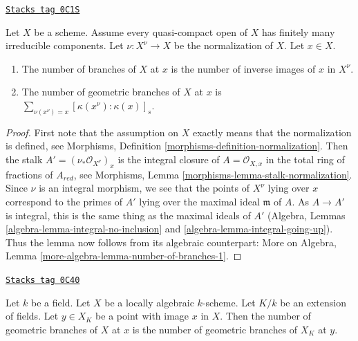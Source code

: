 \begin{lemma}
\label{varieties-lemma-number-of-branches}
\href{https://stacks.math.columbia.edu/tag/0C1S}{\texttt{Stacks tag 0C1S}}

Let $X$ be a scheme. Assume every quasi-compact open of $X$ has
finitely many irreducible components. Let $\nu : X^\nu \to X$
be the normalization of $X$. Let $x \in X$.
\begin{enumerate}
\item The number of branches of $X$ at $x$ is the number of
inverse images of $x$ in $X^\nu$.
\item The number of geometric branches of $X$ at $x$ is
$\sum_{\nu(x^\nu) = x} [\kappa(x^\nu) : \kappa(x)]_s$.
\end{enumerate}
\end{lemma}

\begin{proof}
First note that the assumption on $X$ exactly means that the
normalization is defined, see
Morphisms, Definition \ref{morphisms-definition-normalization}.
Then the stalk $A' = (\nu_*\mathcal{O}_{X^\nu})_x$ is the
integral closure of $A = \mathcal{O}_{X, x}$ in the total
ring of fractions of $A_{red}$, see
Morphisms, Lemma \ref{morphisms-lemma-stalk-normalization}.
Since $\nu$ is an integral morphism, we see that
the points of $X^\nu$ lying over $x$ correspond
to the primes of $A'$ lying over the maximal ideal $\mathfrak m$
of $A$. As $A \to A'$ is integral, this is the same thing as
the maximal ideals of $A'$
(Algebra, Lemmas \ref{algebra-lemma-integral-no-inclusion} and
\ref{algebra-lemma-integral-going-up}).
Thus the lemma now follows
from its algebraic counterpart:
More on Algebra, Lemma \ref{more-algebra-lemma-number-of-branches-1}.
\end{proof}

\begin{lemma}
\label{varieties-lemma-geometric-branches-and-change-of-fields}
\href{https://stacks.math.columbia.edu/tag/0C40}{\texttt{Stacks tag 0C40}}

Let $k$ be a field. Let $X$ be a locally algebraic $k$-scheme.
Let $K/k$ be an extension of fields. Let $y \in X_K$ be a
point with image $x$ in $X$. Then the number of
geometric branches of $X$ at $x$ is the number of geometric
branches of $X_K$ at $y$.
\end{lemma}

